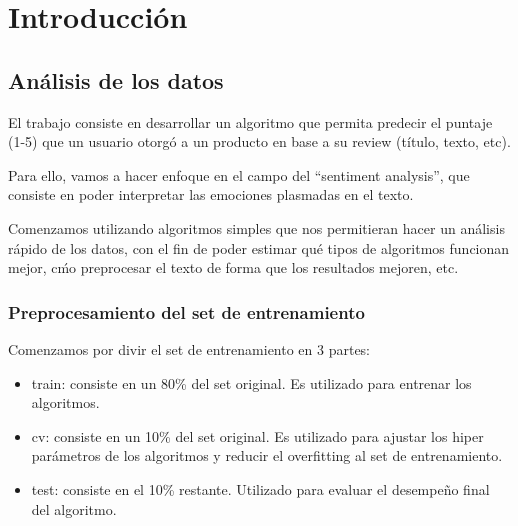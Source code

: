 
\chapter{Introducci\'on} %

\label{Chapter1}


\section{An\'alisis de los datos}

El trabajo consiste en desarrollar un algoritmo que permita predecir el puntaje (1-5) que un usuario
otorg\'o a un producto en base a su review (t\'itulo, texto, etc).

Para ello, vamos a hacer enfoque en el campo del ``sentiment analysis'', que consiste en poder
interpretar las emociones plasmadas en el texto.

Comenzamos utilizando algoritmos simples que nos permitieran hacer un an\'alisis r\'apido de los
datos, con el fin de poder estimar qu\'e tipos de algoritmos funcionan mejor, c\'mo preprocesar el
texto de forma que los resultados mejoren, etc.

\subsection{Preprocesamiento del set de entrenamiento}

Comenzamos por divir el set de entrenamiento en 3 partes:\\


\begin{itemize}
\setlength\itemsep{0em}
  \item train: consiste en un 80\% del set original. Es utilizado para entrenar los algoritmos.
  \item cv: consiste en un 10\% del set original. Es utilizado para ajustar los hiper par\'ametros de los
        algoritmos y reducir el overfitting al set de entrenamiento.
  \item test: consiste en el 10\% restante. Utilizado para evaluar el desempe\~no final del algoritmo.
\end{itemize}

